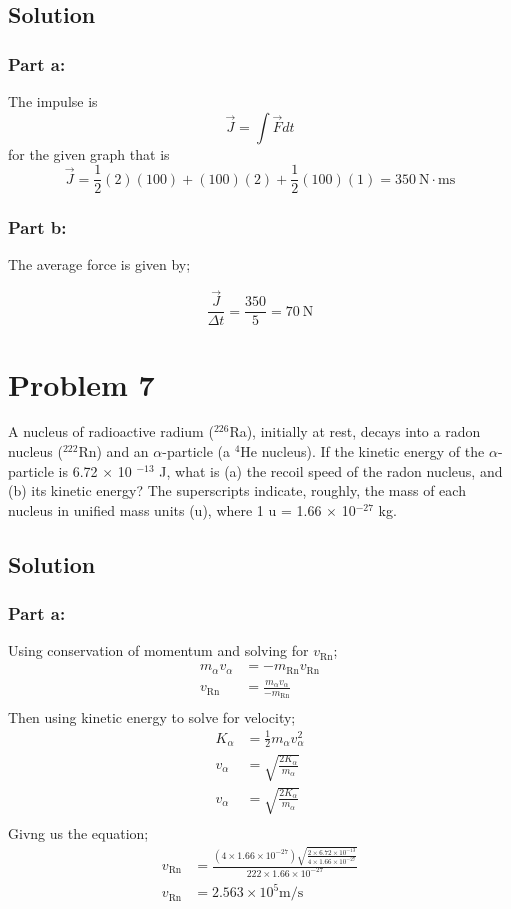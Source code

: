 \documentclass{article}
\begin{document}
\subsection*{Solution}
\subsubsection*{Part a:}
The impulse is
\[
	\vec{J} = \int \vec{F} dt
\]
for the given graph that is
\[
	\vec{J} = \frac{1}{2}(2)(100) + (100)(2) + \frac{1}{2}(100)(1) = \boxed{350 \ \text{N} \cdot \text{ms}}
\]

\subsubsection*{Part b:}
The average force is given by;

\[
	\frac{\vec{J}}{\Delta t} = \frac{350}{5} = \boxed{70\ \text{N}}
\]

\section*{Problem 7}
A nucleus of radioactive radium ($^{226}$Ra), initially at rest, decays into a radon nucleus ($^{222}$Rn)
and an $\alpha$-particle (a $^4$He nucleus). If the kinetic energy of the $\alpha$-particle is 6.72 $\times$ 10 $^{-13}$ J,
what is (a) the recoil speed of the radon nucleus, and (b) its kinetic energy? The superscripts
indicate, roughly, the mass of each nucleus in unified mass units (u), where 1 u = 1.66 $\times$
10$^{-27}$ kg.

\subsection*{Solution}
\subsubsection*{Part a:}
Using conservation of momentum and solving for $v_\text{Rn}$;
\begin{align*}
	m_\alpha v_\alpha &= -m_\text{Rn}v_\text{Rn} \\
	v_\text{Rn} &= \frac{m_\alpha v_\alpha}{-m_\text{Rn}} \\
\end{align*}
Then using kinetic energy to solve for velocity;
\begin{align*}
	K_\alpha &= \frac{1}{2}m_\alpha v_\alpha^2 \\
	v_\alpha &= \sqrt{\frac{2 K_\alpha}{m_\alpha}} \\
	v_\alpha &= \sqrt{\frac{2 K_\alpha}{m_\alpha}} \\
\end{align*}
Givng us the equation;
\begin{align*}
	v_\text{Rn} &= \frac{(4 \times 1.66 \times 10^{-27}) \sqrt{\frac{2 \times 6.72 \times 10^{-13}}{4 \times 1.66 \times 10^{-27}}}}{222 \times 1.66 \times 10^{-27}} \\
	v_\text{Rn} &= \boxed{2.563 \times 10^{5} \text{m}/\text{s}}
\end{align*}
\end{document}
